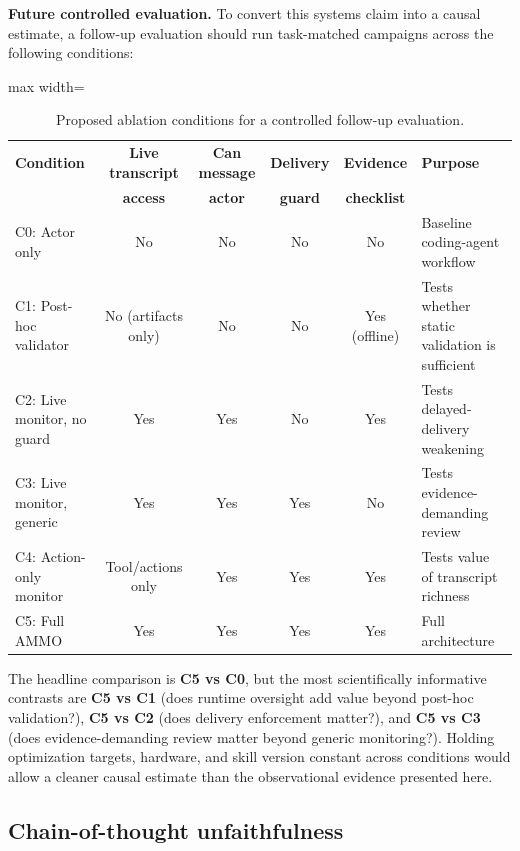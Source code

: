 \documentclass[11pt]{article}
\begin{document}
\textbf{Future controlled evaluation.}
To convert this systems claim into a causal estimate, a follow-up evaluation should run task-matched campaigns across the following conditions:

\begin{table}[h]
\centering
\caption{Proposed ablation conditions for a controlled follow-up evaluation.}
\label{tab:ablation}
\small
\begin{adjustbox}{max width=\textwidth}
\begin{tabular}{@{}lccccl@{}}
\toprule
\textbf{Condition} & \textbf{Live transcript} & \textbf{Can message} & \textbf{Delivery} & \textbf{Evidence} & \textbf{Purpose} \\
 & \textbf{access} & \textbf{actor} & \textbf{guard} & \textbf{checklist} & \\
\midrule
C0: Actor only & No & No & No & No & Baseline coding-agent workflow \\
C1: Post-hoc validator & No (artifacts only) & No & No & Yes (offline) & Tests whether static validation is sufficient \\
C2: Live monitor, no guard & Yes & Yes & No & Yes & Tests delayed-delivery weakening \\
C3: Live monitor, generic & Yes & Yes & Yes & No & Tests evidence-demanding review \\
C4: Action-only monitor & Tool/actions only & Yes & Yes & Yes & Tests value of transcript richness \\
C5: Full AMMO & Yes & Yes & Yes & Yes & Full architecture \\
\bottomrule
\end{tabular}
\end{adjustbox}
\end{table}

The headline comparison is \textbf{C5 vs C0}, but the most scientifically informative contrasts are \textbf{C5 vs C1} (does runtime oversight add value beyond post-hoc validation?), \textbf{C5 vs C2} (does delivery enforcement matter?), and \textbf{C5 vs C3} (does evidence-demanding review matter beyond generic monitoring?). Holding optimization targets, hardware, and skill version constant across conditions would allow a cleaner causal estimate than the observational evidence presented here.

\subsection{Chain-of-thought unfaithfulness}
\end{document}
